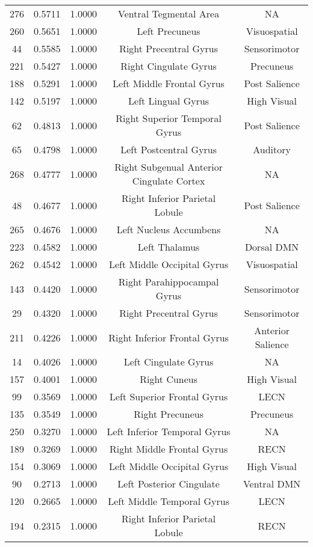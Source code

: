 \documentclass[10pt,letterpaper]{article}\usepackage[]{graphicx}\usepackage[]{color}
\begin{document}
\begin{center}
\begin{longtable}[c]{ccccc}
	276	& 0.5711 & 1.0000 & Ventral Tegmental Area & NA \\
	260	& 0.5651 & 1.0000 & Left Precuneus & Visuospatial \\
	44	& 0.5585 & 1.0000 & Right Precentral Gyrus & Sensorimotor \\
	221	& 0.5427 & 1.0000 & Right Cingulate Gyrus & Precuneus \\
	188	& 0.5291 & 1.0000 & Left Middle Frontal Gyrus & Post Salience \\
	142	& 0.5197 & 1.0000 & Left Lingual Gyrus & High Visual \\
	62	& 0.4813 & 1.0000 & Right Superior Temporal Gyrus & Post Salience \\
	65	& 0.4798 & 1.0000 & Left Postcentral Gyrus & Auditory \\
	268	& 0.4777 & 1.0000 & Right Subgenual Anterior Cingulate Cortex & NA \\
	48	& 0.4677 & 1.0000 & Right Inferior Parietal Lobule & Post Salience \\
	265	& 0.4676 & 1.0000 & Left Nucleus Accumbens & NA \\
	223	& 0.4582 & 1.0000 & Left Thalamus & Dorsal DMN \\
	262	& 0.4542 & 1.0000 & Left Middle Occipital Gyrus & Visuospatial \\
	143	& 0.4420 & 1.0000 & Right Parahippocampal Gyrus & Sensorimotor \\
	29	& 0.4320 & 1.0000 & Right Precentral Gyrus & Sensorimotor \\
	211	& 0.4226 & 1.0000 & Right Inferior Frontal Gyrus & Anterior Salience \\
	14	& 0.4026 & 1.0000 & Left Cingulate Gyrus & NA \\
	157	& 0.4001 & 1.0000 & Right Cuneus & High Visual \\
	99	& 0.3569 & 1.0000 & Left Superior Frontal Gyrus & LECN \\
	135	& 0.3549 & 1.0000 & Right Precuneus & Precuneus \\
	250	& 0.3270 & 1.0000 & Left Inferior Temporal Gyrus & NA \\
	189	& 0.3269 & 1.0000 & Right Middle Frontal Gyrus & RECN \\
	154	& 0.3069 & 1.0000 & Left Middle Occipital Gyrus & High Visual \\
	90	& 0.2713 & 1.0000 & Left Posterior Cingulate & Ventral DMN \\
	120	& 0.2665 & 1.0000 & Left Middle Temporal Gyrus & LECN \\
	194	& 0.2315 & 1.0000 & Right Inferior Parietal Lobule & RECN \\

\end{longtable}
\end{center}
\end{document}
